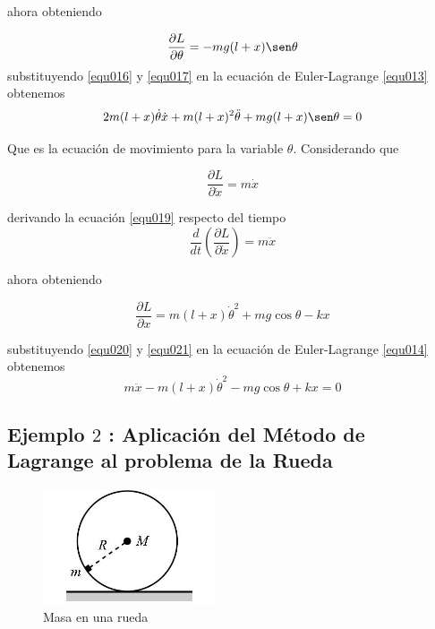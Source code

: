 \documentclass[12pt]{book}
\theoremstyle{definition}
\theoremstyle{remark}
\theoremstyle{plain}
\begin{document}
ahora obteniendo

\begin{equation}
\label{equ017}
 \frac{\partial L}{\partial \theta}=-m g (l+x) \sen \theta
\end{equation}
 substituyendo \ref{equ016} y \ref{equ017} en la ecuación de Euler-Lagrange \ref{equ013} obtenemos
\begin{equation}
\label{equ018}
 2 m (l+x) \dot{\theta} \dot{x} + m (l+x)^2\ddot{\theta}+m g (l+x) \sen \theta=0
\end{equation}

Que es la ecuación de movimiento para la variable $\theta$. Considerando que

\begin{equation}
\label{equ019}
\frac{\partial L}{\partial \dot{x}}=m \dot{x}
\end{equation}

derivando la ecuación \ref{equ019} respecto del tiempo 
\begin{equation}
\label{equ020}
\frac{d}{d t} \left ( \frac{\partial L}{\partial \dot{x}} \right )=m \ddot{x}
\end{equation}

ahora obteniendo

\begin{equation}
\label{equ021}
 \frac{\partial L}{\partial x}=m (l+x) \dot{\theta}^2+m g \cos \theta - k x
\end{equation}

 substituyendo \ref{equ020} y \ref{equ021} en la ecuación de Euler-Lagrange \ref{equ014} obtenemos
\begin{equation}
\label{equ022}
m  \ddot{x} - m (l+x) \dot{\theta}^2-m g \cos \theta + k x=0
\end{equation}

\subsection{Ejemplo $2$ : Aplicación del Método de Lagrange al problema de la Rueda }

\begin{figure}
\centering
\includegraphics[width=2in]{rueda.jpeg}
\caption{Masa en una rueda}
\label{fig101}
\end{figure}
\end{document}
